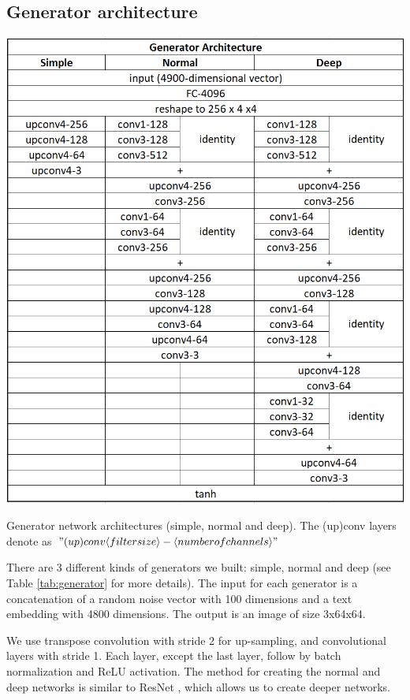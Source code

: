 \documentclass[a4paper]{article}
\begin{document}
\subsection{Generator architecture}\label{generator}
\begin{table}[!ht]
    \centering
    \includegraphics[trim={0.03cm 0.01cm 0.01cm 0.03cm},clip,width=\textwidth]{generator.jpg}
    \caption{Generator network architectures (simple, normal and deep). The (up)conv layers denote as $"(up)conv\langle filter size \rangle - \langle number of channels\rangle"$}
    \label{tab:generator}
\end{table}
There are 3 different kinds of generators we built: simple, normal and deep (see Table \ref{tab:generator} for more details). The input for each generator is a concatenation of a random noise vector with 100 dimensions and a text embedding with 4800 dimensions. The output is an image of size 3x64x64.

We use transpose convolution with stride 2 for up-sampling, and convolutional layers with stride 1. Each layer, except the last layer, follow by batch normalization and ReLU activation. The method for creating the normal and deep networks is similar to ResNet \cite{he2016deep}, which allows us to create deeper networks.
\end{document}
